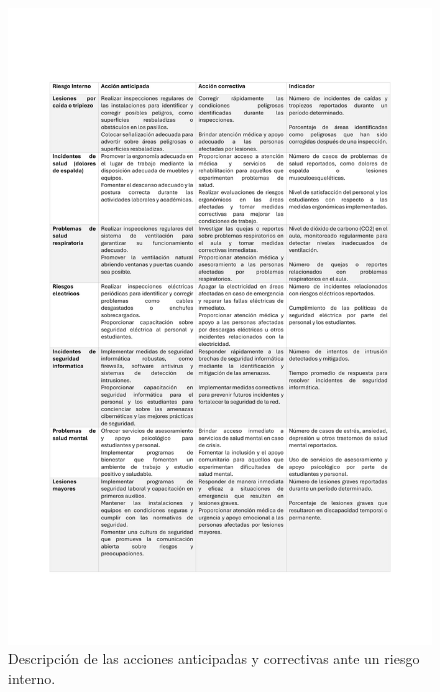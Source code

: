     \begin{figure}[H]
        \centering
        \includegraphics[scale=0.3]{15/img/tablaPlanDeAccionRiesgosInternos.pdf}
        \caption{Descripción de las acciones anticipadas y correctivas ante un riesgo interno.}
        \label{fig:tablaPlanDeAccionRiesgosInternos}
    \end{figure}
    
